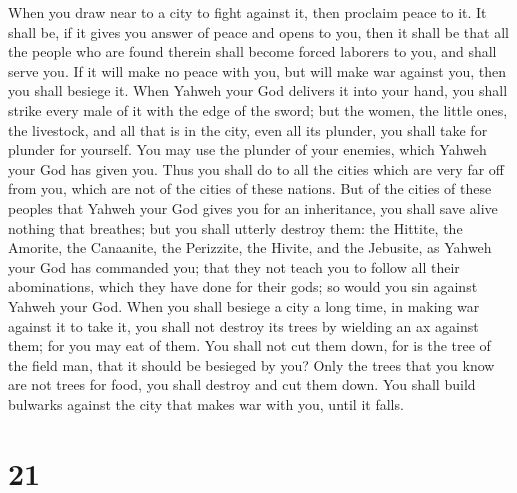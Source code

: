  When you draw near to a city to fight against it, then
proclaim peace to it.  It shall be, if it gives you answer
of peace and opens to you, then it shall be that all the people who are
found therein shall become forced laborers to you, and shall serve you.
 If it will make no peace with you, but will make war
against you, then you shall besiege it.  When Yahweh your
God delivers it into your hand, you shall strike every male of it with
the edge of the sword;  but the women, the little ones, the
livestock, and all that is in the city, even all its plunder, you shall
take for plunder for yourself. You may use the plunder of your enemies,
which Yahweh your God has given you.  Thus you shall do to
all the cities which are very far off from you, which are not of the
cities of these nations.  But of the cities of these
peoples that Yahweh your God gives you for an inheritance, you shall
save alive nothing that breathes;  but you shall utterly
destroy them: the Hittite, the Amorite, the Canaanite, the Perizzite,
the Hivite, and the Jebusite, as Yahweh your God has commanded you;
 that they not teach you to follow all their abominations,
which they have done for their gods; so would you sin against Yahweh
your God.  When you shall besiege a city a long time, in
making war against it to take it, you shall not destroy its trees by
wielding an ax against them; for you may eat of them. You shall not cut
them down, for is the tree of the field man, that it should be besieged
by you?  Only the trees that you know are not trees for
food, you shall destroy and cut them down. You shall build bulwarks
against the city that makes war with you, until it falls.

\hypertarget{section-20}{%
\section{21}\label{section-20}}

